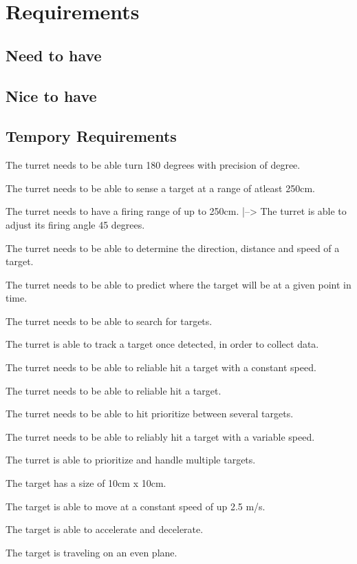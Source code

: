 \section{Requirements}

\subsection{Need to have}


\subsection{Nice to have}



\subsection{Tempory Requirements}
The turret needs to be able turn 180 degrees with precision of  degree.

The turret needs to be able to sense a target at a range of atleast 250cm.

The turret needs to have a firing range of up to 250cm.
|--> The turret is able to adjust its firing angle 45 degrees.

The turret needs to be able to determine the direction, distance and speed of a target.

The turret needs to be able to predict where the target will be at a given point in time.

The turret needs to be able to search for targets.

The turret is able to track a target once detected, in order to collect data.

The turret needs to be able to reliable hit a target with a constant speed.

The turret needs to be able to reliable hit 
a target.

The turret needs to be able to hit prioritize between several targets.

The turret needs to be able to reliably hit a target with a variable speed.



The turret is able to prioritize and handle multiple targets.\nl

The target has a size of 10cm x 10cm.\nl

The target is able to move at a constant speed of up 2.5 m/s.\nl

The target is able to accelerate and decelerate.\nl

The target is traveling on an even plane.\nl
